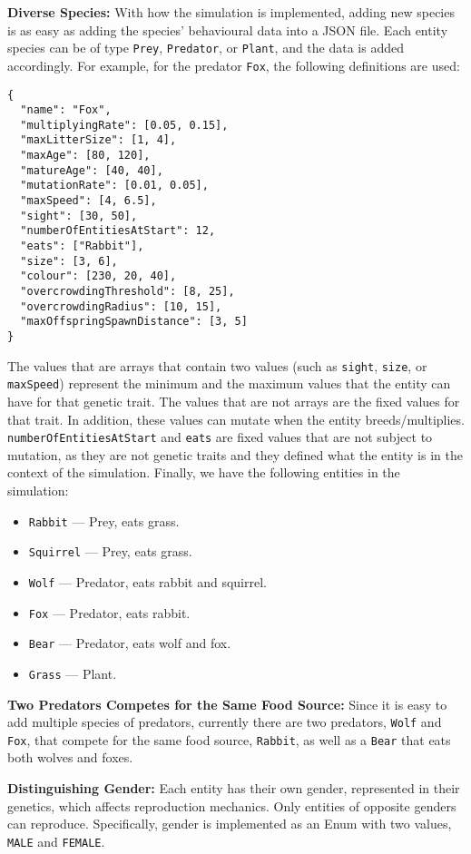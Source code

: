 \documentclass[10pt, a4paper]{scrartcl}
\begin{document}
\begin{multicols}{2}
    \noindent \textbf{Diverse Species:} With how the simulation is implemented, adding new species is as easy as adding
    the species' behavioural data into a JSON file. Each entity species can be of type \verb|Prey|, \verb|Predator|,
    or \verb|Plant|, and the data is added accordingly. For example, for the predator \verb|Fox|, the following definitions
    are used:
    \begin{verbatim}
{
  "name": "Fox",
  "multiplyingRate": [0.05, 0.15],
  "maxLitterSize": [1, 4],
  "maxAge": [80, 120],
  "matureAge": [40, 40],
  "mutationRate": [0.01, 0.05],
  "maxSpeed": [4, 6.5],
  "sight": [30, 50],
  "numberOfEntitiesAtStart": 12,
  "eats": ["Rabbit"],
  "size": [3, 6],
  "colour": [230, 20, 40],
  "overcrowdingThreshold": [8, 25],
  "overcrowdingRadius": [10, 15],
  "maxOffspringSpawnDistance": [3, 5]
}
    \end{verbatim}
    \noindent The values that are arrays that contain two values (such as \verb|sight|, \verb|size|, or \verb|maxSpeed|) represent
    the minimum and the maximum values that the entity can have for that genetic trait. The values that are not arrays are the fixed
    values for that trait. In addition, these values can mutate when the entity breeds/multiplies. \verb|numberOfEntitiesAtStart| and
    \verb|eats| are fixed values that are not subject to mutation, as they are not genetic traits and they defined what the entity
    is in the context of the simulation. Finally, we have the following entities in the simulation:
    \begin{itemize}
      \item \verb|Rabbit| — Prey, eats grass.
      \item \verb|Squirrel| — Prey, eats grass.
      \item \verb|Wolf| — Predator, eats rabbit and squirrel.
      \item \verb|Fox| — Predator, eats rabbit.
      \item \verb|Bear| — Predator, eats wolf and fox.
      \item \verb|Grass| — Plant.
    \end{itemize}

    \noindent \textbf{Two Predators Competes for the Same Food Source:}
    Since it is easy to add multiple species of predators, currently there are two predators, \verb|Wolf| and \verb|Fox|,
    that compete for the same food source, \verb|Rabbit|, as well as a \verb|Bear| that eats both wolves and foxes.

    \noindent \textbf{Distinguishing Gender:} Each entity has their own gender, represented in their genetics,
    which affects reproduction mechanics. Only entities of opposite genders can reproduce. Specifically, gender is
    implemented as an Enum with two values, \verb|MALE| and \verb|FEMALE|.


\end{multicols}
\end{document}
